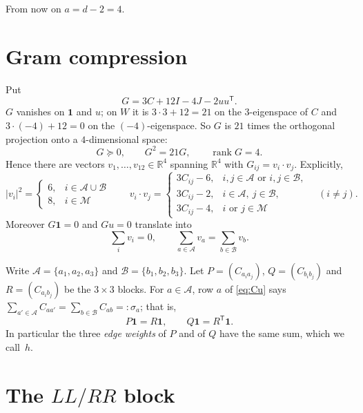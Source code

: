 \documentclass[11pt,a4paper]{amsart}
\theoremstyle{definition}
\theoremstyle{remark}
\newcommand{\R}{\mathbb{R}}
\newcommand{\one}{\mathbf{1}}
\newcommand{\cA}{\mathcal{A}}
\newcommand{\cB}{\mathcal{B}}
\newcommand{\cM}{\mathcal{M}}
\newcommand{\rk}{\operatorname{rank}}
\begin{document}
From now on $a=d-2=4$.

\section{Gram compression}\label{sec:gram}

Put
\begin{equation}\label{eq:G}
G=3C+12I-4J-2uu^{\mathsf T}.
\end{equation}
$G$ vanishes on $\one$ and $u$; on $W$ it is $3\cdot3+12=21$ on the $3$-eigenspace of $C$ and
$3\cdot(-4)+12=0$ on the $(-4)$-eigenspace. So $G$ is $21$ times the orthogonal projection onto a
$4$-dimensional space:
\begin{equation}\label{eq:Gproj}
G\succeq0,\qquad G^2=21G,\qquad \rk G=4 .
\end{equation}
Hence there are vectors $v_1,\dots,v_{12}\in\R^4$ spanning $\R^4$ with $G_{ij}=v_i\cdot v_j$. Explicitly,
\begin{equation}\label{eq:ip}
|v_i|^2=\begin{cases}6,&i\in\cA\cup\cB\\8,&i\in\cM\end{cases}\qquad
v_i\cdot v_j=\begin{cases}3C_{ij}-6,&i,j\in\cA\text{ or }i,j\in\cB,\\
3C_{ij}-2,&i\in\cA,\ j\in\cB,\\
3C_{ij}-4,&i\text{ or }j\in\cM\end{cases}\quad(i\ne j).
\end{equation}
Moreover $G\one=0$ and $Gu=0$ translate into
\begin{equation}\label{eq:sums}
\sum_{i}v_i=0,\qquad \sum_{a\in\cA}v_a=\sum_{b\in\cB}v_b .
\end{equation}

Write $\cA=\{a_1,a_2,a_3\}$ and $\cB=\{b_1,b_2,b_3\}$. Let $P=(C_{a_ia_j})$, $Q=(C_{b_ib_j})$ and
$R=(C_{a_ib_j})$ be the $3\times3$ blocks. For $a\in\cA$, row $a$ of \eqref{eq:Cu} says
$\sum_{a'\in\cA}C_{aa'}=\sum_{b\in\cB}C_{ab}=:\sigma_a$; that is,
\begin{equation}\label{eq:margins}
P\one=R\one,\qquad Q\one=R^{\mathsf T}\one .
\end{equation}
In particular the three \emph{edge weights} of $P$ and of $Q$ have the same sum, which we call~$h$.

\section{The \texorpdfstring{$LL/RR$}{LL/RR} block}\label{sec:block}
\end{document}
